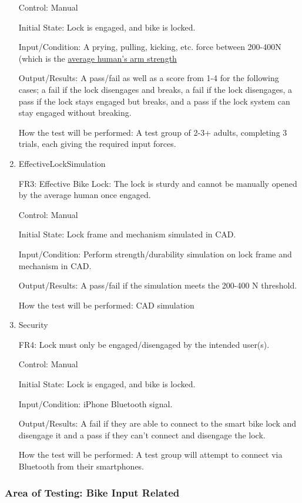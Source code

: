 \documentclass[12pt, titlepage]{article}
\begin{document}
\begin{enumerate}
Control: Manual

Initial State: Lock is engaged, and bike is locked.

Input/Condition: A prying, pulling, kicking, etc. force between 200-400N (which is the \href{https://www.tandfonline.com/doi/pdf/10.1080/10803548.2004.11076594?cookieSet=1}{average human's arm strength}

Output/Results: A pass/fail as well as a score from 1-4 for the following cases; a fail if the lock disengages and breaks, a fail if the lock disengages, a pass if the lock stays engaged but breaks, and a pass if the lock system can stay engaged without breaking.

How the test will be performed: A test group of 2-3+ adults, completing 3 trials, each giving the required input forces.

\item{EffectiveLockSimulation

FR3: Effective Bike Lock: The lock is sturdy and cannot be manually opened by the average human once engaged. }

Control: Manual

Initial State: Lock frame and mechanism simulated in CAD.

Input/Condition: Perform strength/durability simulation on lock frame and mechanism in CAD. 

Output/Results: A pass/fail if the simulation meets the 200-400 N threshold. 

How the test will be performed: CAD simulation

\item{Security

FR4: Lock must only be engaged/disengaged by the intended user(s). }

Control: Manual

Initial State: Lock is engaged, and bike is locked.

Input/Condition: iPhone Bluetooth signal.

Output/Results: A fail if they are able to connect to the smart bike lock and disengage it and a pass if they can’t connect and disengage the lock.

How the test will be performed: A test group will attempt to connect via Bluetooth from their smartphones.

\end{enumerate}

\subsubsection{Area of Testing: Bike Input Related}
\end{document}
